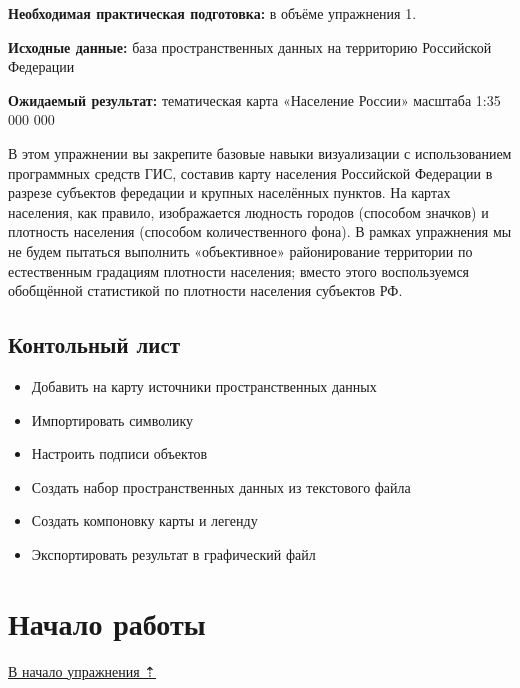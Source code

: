 \documentclass[
  12pt,
]{book}
\providecommand{\tightlist}{%
  \setlength{\itemsep}{0pt}\setlength{\parskip}{0pt}}
\begin{document}
\textbf{Необходимая практическая подготовка:} в объёме упражнения 1.

\textbf{Исходные данные:} база пространственных данных на территорию Российской Федерации

\textbf{Ожидаемый результат:} тематическая карта «Население России» масштаба 1:35 000 000

В этом упражнении вы закрепите базовые навыки визуализации с использованием программных средств ГИС, составив карту населения Российской Федерации в разрезе субъектов фередации и крупных населённых пунктов. На картах населения, как правило, изображается людность городов (способом значков) и плотность населения (способом количественного фона). В рамках упражнения мы не будем пытаться выполнить «объективное» районирование территории по естественным градациям плотности населения; вместо этого воспользуемся обобщённой статистикой по плотности населения субъектов РФ.

\hypertarget{map-design-population-checklist}{%
\subsection{Контольный лист}\label{map-design-population-checklist}}

\begin{itemize}
\tightlist
\item
  Добавить на карту источники пространственных данных
\item
  Импортировать символику
\item
  Настроить подписи объектов
\item
  Создать набор пространственных данных из текстового файла
\item
  Создать компоновку карты и легенду
\item
  Экспортировать результат в графический файл
\end{itemize}

\hypertarget{map-design-population-begin}{%
\section{Начало работы}\label{map-design-population-begin}}

\protect\hyperlink{map-design-population}{В начало упражнения ⇡}
\end{document}
